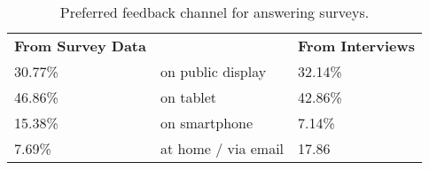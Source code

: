 \begin{table}[h]
\center
\begin{tabular}{lllll}
\multicolumn{2}{l}{\textbf{From Survey Data}} &  & \multicolumn{2}{l}{\textbf{From Interviews}} \\
30.77\%                   & \multicolumn{3}{l}{on public display}    & 32.14\%                  \\
46.86\%                   & \multicolumn{3}{l}{on tablet}            & 42.86\%                  \\
15.38\%                   & \multicolumn{3}{l}{on smartphone}        & 7.14\%                   \\
7.69\%                    & \multicolumn{3}{l}{at home / via email}  & 17.86                   
\end{tabular}
\caption[Feedback Channel]{Preferred feedback channel for answering surveys.}
\label{table:5-feedback-channel}
\end{table}